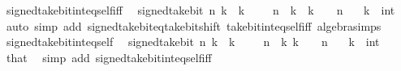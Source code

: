 \begin{isabellebody}
\endisatagproof
{\isafoldproof}%
%
\isadelimproof
\isanewline
%
\endisadelimproof
\isanewline
{}\isamarkupfalse%
\ signed{\isacharunderscore}{\kern0pt}take{\isacharunderscore}{\kern0pt}bit{\isacharunderscore}{\kern0pt}int{\isacharunderscore}{\kern0pt}eq{\isacharunderscore}{\kern0pt}self{\isacharunderscore}{\kern0pt}iff{\isacharcolon}{\kern0pt}\isanewline
\ \ {\isacartoucheopen}signed{\isacharunderscore}{\kern0pt}take{\isacharunderscore}{\kern0pt}bit\ n\ k\ {\isacharequal}{\kern0pt}\ k\ {\isasymlongleftrightarrow}\ {\isacharminus}{\kern0pt}\ {\isacharparenleft}{\kern0pt}{}\ {\isacharcircum}{\kern0pt}\ n{\isacharparenright}{\kern0pt}\ {\isasymle}\ k\ {\isasymand}\ k\ {\isacharless}{\kern0pt}\ {}\ {\isacharcircum}{\kern0pt}\ n{\isacartoucheclose}\isanewline
\ \ \ k\ {\isacharcolon}{\kern0pt}{\isacharcolon}{\kern0pt}\ int\isanewline
%
\isadelimproof
\ \ %
\endisadelimproof
%
\isatagproof
{}\isamarkupfalse%
\ {\isacharparenleft}{\kern0pt}auto\ simp\ add{\isacharcolon}{\kern0pt}\ signed{\isacharunderscore}{\kern0pt}take{\isacharunderscore}{\kern0pt}bit{\isacharunderscore}{\kern0pt}eq{\isacharunderscore}{\kern0pt}take{\isacharunderscore}{\kern0pt}bit{\isacharunderscore}{\kern0pt}shift\ take{\isacharunderscore}{\kern0pt}bit{\isacharunderscore}{\kern0pt}int{\isacharunderscore}{\kern0pt}eq{\isacharunderscore}{\kern0pt}self{\isacharunderscore}{\kern0pt}iff\ algebra{\isacharunderscore}{\kern0pt}simps{\isacharparenright}{\kern0pt}%
\endisatagproof
{\isafoldproof}%
%
\isadelimproof
\isanewline
%
\endisadelimproof
\isanewline
{}\isamarkupfalse%
\ signed{\isacharunderscore}{\kern0pt}take{\isacharunderscore}{\kern0pt}bit{\isacharunderscore}{\kern0pt}int{\isacharunderscore}{\kern0pt}eq{\isacharunderscore}{\kern0pt}self{\isacharcolon}{\kern0pt}\isanewline
\ \ {\isacartoucheopen}signed{\isacharunderscore}{\kern0pt}take{\isacharunderscore}{\kern0pt}bit\ n\ k\ {\isacharequal}{\kern0pt}\ k{\isacartoucheclose}\ \ {\isacartoucheopen}{\isacharminus}{\kern0pt}\ {\isacharparenleft}{\kern0pt}{}\ {\isacharcircum}{\kern0pt}\ n{\isacharparenright}{\kern0pt}\ {\isasymle}\ k{\isacartoucheclose}\ {\isacartoucheopen}k\ {\isacharless}{\kern0pt}\ {}\ {\isacharcircum}{\kern0pt}\ n{\isacartoucheclose}\isanewline
\ \ \ k\ {\isacharcolon}{\kern0pt}{\isacharcolon}{\kern0pt}\ int\isanewline
%
\isadelimproof
\ \ %
\endisadelimproof
%
\isatagproof
{}\isamarkupfalse%
\ that\ \isamarkupfalse%
\ {\isacharparenleft}{\kern0pt}simp\ add{\isacharcolon}{\kern0pt}\ signed{\isacharunderscore}{\kern0pt}take{\isacharunderscore}{\kern0pt}bit{\isacharunderscore}{\kern0pt}int{\isacharunderscore}{\kern0pt}eq{\isacharunderscore}{\kern0pt}self{\isacharunderscore}{\kern0pt}iff{\isacharparenright}{\kern0pt}%

\end{isabellebody}
